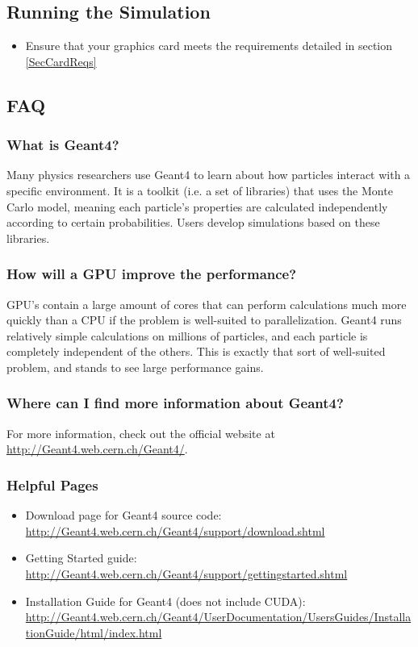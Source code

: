 \documentclass[12pt]{article}
\begin{document}
\subsection{Running the Simulation} %
\begin{itemize}
\item Ensure that your graphics card meets the requirements detailed in section \ref{SecCardReqs}
\end{itemize}

\subsection{FAQ} %
\subsubsection{What is Geant4?}\label{SecBackground}
Many physics researchers use Geant4 to learn about how particles interact with a specific environment. It is a toolkit (i.e. a set of libraries) that uses the Monte Carlo model, meaning each particle's properties are calculated independently according to certain probabilities. Users develop simulations based on these libraries.

\subsubsection{How will a GPU improve the performance?}
GPU's contain a large amount of cores that can perform calculations much more quickly than a CPU if the problem is well-suited to parallelization. Geant4 runs relatively simple calculations on millions of particles, and each particle is completely independent of the others. This is exactly that sort of well-suited problem, and stands to see large performance gains.

\subsubsection{Where can I find more information about Geant4?}
For more information, check out the official website at \url{http://Geant4.web.cern.ch/Geant4/}.

\subsubsection{Helpful Pages}
\begin{itemize}
\item Download page for Geant4 source code: \url{http://Geant4.web.cern.ch/Geant4/support/download.shtml}
\item Getting Started guide: \url{http://Geant4.web.cern.ch/Geant4/support/gettingstarted.shtml}
\item Installation Guide for Geant4 (does not include CUDA): \url{http://Geant4.web.cern.ch/Geant4/UserDocumentation/UsersGuides/InstallationGuide/html/index.html}
\end{itemize}
\end{document}
